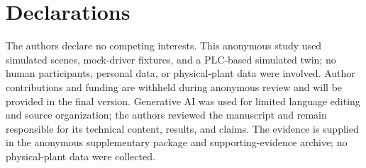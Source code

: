 \documentclass[journal]{IEEEtran}
\begin{document}
\IEEEpeerreviewmaketitle









\section*{Declarations}
The authors declare no competing interests. This anonymous study used simulated scenes, mock-driver fixtures, and a PLC-based simulated twin; no human participants, personal data, or physical-plant data were involved. Author contributions and funding are withheld during anonymous review and will be provided in the final version. Generative AI was used for limited language editing and source organization; the authors reviewed the manuscript and remain responsible for its technical content, results, and claims. The evidence is supplied in the anonymous supplementary package and supporting-evidence archive; no physical-plant data were collected.



\end{document}
